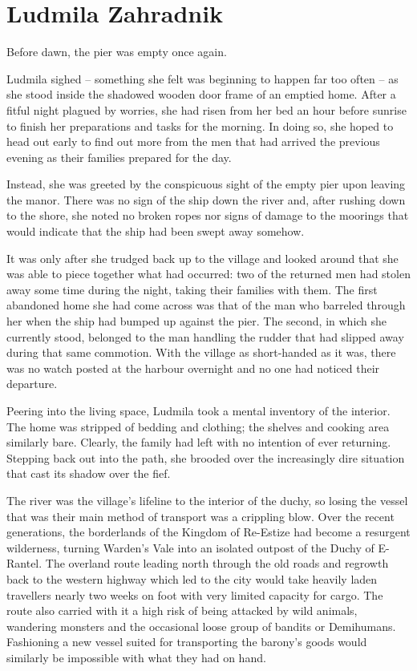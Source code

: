 \chapter{Ludmila Zahradnik}

Before dawn, the pier was empty once again.

 

Ludmila sighed – something she felt was beginning to happen far too often – as she stood inside the shadowed wooden door frame of an emptied home. After a fitful night plagued by worries, she had risen from her bed an hour before sunrise to finish her preparations and tasks for the morning. In doing so, she hoped to head out early to find out more from the men that had arrived the previous evening as their families prepared for the day.

 

Instead, she was greeted by the conspicuous sight of the empty pier upon leaving the manor. There was no sign of the ship down the river and, after rushing down to the shore, she noted no broken ropes nor signs of damage to the moorings that would indicate that the ship had been swept away somehow.

 

It was only after she trudged back up to the village and looked around that she was able to piece together what had occurred: two of the returned men had stolen away some time during the night, taking their families with them. The first abandoned home she had come across was that of the man who barreled through her when the ship had bumped up against the pier. The second, in which she currently stood, belonged to the man handling the rudder that had slipped away during that same commotion. With the village as short-handed as it was, there was no watch posted at the harbour overnight and no one had noticed their departure.

 

Peering into the living space, Ludmila took a mental inventory of the interior. The home was stripped of bedding and clothing; the shelves and cooking area similarly bare. Clearly, the family had left with no intention of ever returning. Stepping back out into the path, she brooded over the increasingly dire situation that cast its shadow over the fief.

 

The river was the village’s lifeline to the interior of the duchy, so losing the vessel that was their main method of transport was a crippling blow. Over the recent generations, the borderlands of the Kingdom of Re-Estize had become a resurgent wilderness, turning Warden’s Vale into an isolated outpost of the Duchy of E-Rantel. The overland route leading north through the old roads and regrowth back to the western highway which led to the city would take heavily laden travellers nearly two weeks on foot with very limited capacity for cargo. The route also carried with it a high risk of being attacked by wild animals, wandering monsters and the occasional loose group of bandits or Demihumans. Fashioning a new vessel suited for transporting the barony’s goods would similarly be impossible with what they had on hand.

